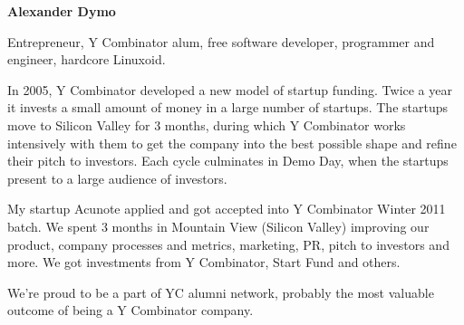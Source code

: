 \documentclass[12pt]{letter}
\begin{document}
{\large\centering\textbf{Alexander Dymo}\\}

\address
{
  \texttt{alex@alexdymo.com} \\
  +380\,67\,512\,28\,01 \\
  Mykolayiv, Ukraine \\
}


\begin{llist}

  \vspace{.30in}                %


             Entrepreneur, Y Combinator alum, free software developer,
             programmer and engineer, hardcore Linuxoid.



  \startexperience

           \item In 2005, Y Combinator developed a new model of startup funding. Twice a year it invests a small amount of money in a large number of startups. The startups move to Silicon Valley for 3 months, during which Y Combinator works intensively with them to get the company into the best possible shape and refine their pitch to investors. Each cycle culminates in Demo Day, when the startups present to a large audience of investors. 

           \item My startup Acunote applied and got accepted into Y Combinator Winter 2011 batch. We spent 3 months in Mountain View (Silicon Valley) improving our product, company processes and metrics, marketing, PR, pitch to investors and more. We got investments from Y Combinator, Start Fund and others.

           \item We're proud to be a part of YC alumni network, probably the most valuable outcome of being a Y Combinator company.

  \endexperience



\end{llist}
\end{document}
